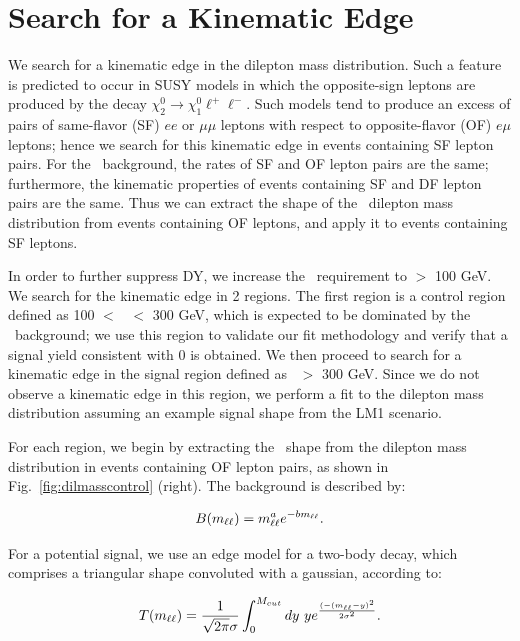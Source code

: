 \section{Search for a Kinematic Edge}
\label{sec:fit}

We search for a kinematic edge in the dilepton mass distribution. Such a feature is 
predicted to occur in SUSY models in which the opposite-sign leptons are produced by the
decay $\chi_2^0 \to \chi_1^0 \ell^+\ell^-$. Such models tend to produce an excess of pairs 
of same-flavor (SF) $ee$ or $\mu\mu$ leptons with respect to opposite-flavor (OF) $e\mu$
leptons; hence we search for this kinematic edge in events containing SF lepton pairs. 
For the \ttbar\ background, the rates of SF and OF lepton pairs are the same;
furthermore, the kinematic properties of events containing SF and DF lepton pairs are the
same. Thus we can extract the shape of the \ttbar\ dilepton mass distribution from events 
containing OF leptons, and apply it to events containing SF leptons.

In order to further suppress DY, we increase the \MET\ requirement to \MET $>$ 100 GeV. 
We search for the kinematic edge in 2 regions.  The first region is a control region defined
as 100 $<$ \Ht\ $<$ 300 GeV, which is expected to be dominated by the \ttbar\ background; we use 
this region to validate our fit methodology and verify that a signal yield consistent with 0 
is obtained. We then proceed to search for a kinematic edge in the signal region defined as 
\Ht\ $>$ 300 GeV. Since we do not observe a kinematic edge in this region, we perform a 
fit to the dilepton mass distribution assuming an example signal shape from the LM1 scenario.

For each region, we begin by extracting the \ttbar\ shape from the dilepton mass distribution 
in events containing OF lepton pairs, as shown in Fig.~\ref{fig:dilmasscontrol} (right). 
The background is described by:

\begin{equation}
B(m_{\ell\ell}) = m_{\ell\ell}^a e^{-b m_{\ell\ell}}.
\end{equation}

For a potential signal, we use an edge model for a two-body decay, which comprises a triangular shape convoluted with a gaussian,
according to:

\begin{equation}
T(m_{\ell\ell}) = \frac{1}{\sqrt{2\pi}\sigma}\int_0^{M_{cut}} dy~y e^{\frac{(-(m_{\ell\ell}-y)^2}{2\sigma^2}}. 
\end{equation}


